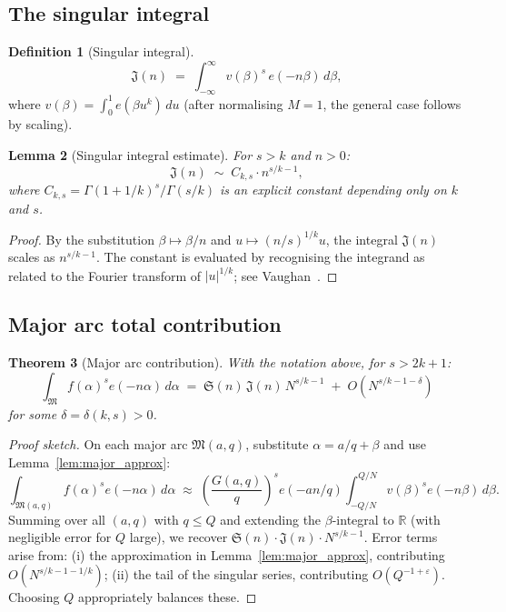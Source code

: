\documentclass[12pt,a4paper]{amsart}
\newtheorem{theorem}{Theorem}[section]
\newtheorem{lemma}[theorem]{Lemma}
\theoremstyle{definition}
\newtheorem{definition}[theorem]{Definition}
\newcommand{\R}{\mathbb{R}}
\newcommand{\eq}[1]{e\!\left(#1\right)}
\begin{document}
\subsection{The singular integral}

\begin{definition}[Singular integral]
  \[
    \mathfrak{J}(n) \;=\; \int_{-\infty}^{\infty} v(\beta)^s\, \eq{-n\beta}\, d\beta,
  \]
  where $v(\beta) = \int_0^1 \eq{\beta u^k}\, du$ (after normalising $M=1$,
  the general case follows by scaling).
\end{definition}

\begin{lemma}[Singular integral estimate]\label{lem:sing_int}
  For $s > k$ and $n > 0$:
  \[
    \mathfrak{J}(n) \;\sim\; C_{k,s} \cdot n^{s/k - 1},
  \]
  where $C_{k,s} = \Gamma(1 + 1/k)^s / \Gamma(s/k)$ is an explicit constant
  depending only on $k$ and $s$.
\end{lemma}

\begin{proof}
  By the substitution $\beta \mapsto \beta/n$ and $u \mapsto (n/s)^{1/k} u$,
  the integral $\mathfrak{J}(n)$ scales as $n^{s/k - 1}$.  The constant
  is evaluated by recognising the integrand as related to the Fourier
  transform of $|u|^{1/k}$; see Vaughan~\cite[Chapter~4]{Vaughan1981}.
\end{proof}

\subsection{Major arc total contribution}

\begin{theorem}[Major arc contribution]\label{thm:major}
  With the notation above, for $s > 2k+1$:
  \[
    \int_{\mathfrak{M}} f(\alpha)^s \eq{-n\alpha}\, d\alpha
    \;=\; \mathfrak{S}(n)\, \mathfrak{J}(n)\, N^{s/k - 1}
          \;+\; O\!\left(N^{s/k - 1 - \delta}\right)
  \]
  for some $\delta = \delta(k, s) > 0$.
\end{theorem}

\begin{proof}[Proof sketch]
  On each major arc $\mathfrak{M}(a, q)$, substitute
  $\alpha = a/q + \beta$ and use Lemma~\ref{lem:major_approx}:
  \[
    \int_{\mathfrak{M}(a,q)} f(\alpha)^s \eq{-n\alpha}\, d\alpha
    \;\approx\; \left(\frac{G(a,q)}{q}\right)^s \eq{-an/q}
                \int_{-Q/N}^{Q/N} v(\beta)^s \eq{-n\beta}\, d\beta.
  \]
  Summing over all $(a, q)$ with $q \leq Q$ and extending the $\beta$-integral
  to $\R$ (with negligible error for $Q$ large), we recover
  $\mathfrak{S}(n) \cdot \mathfrak{J}(n) \cdot N^{s/k-1}$.  Error
  terms arise from: (i) the approximation in Lemma~\ref{lem:major_approx},
  contributing $O(N^{s/k - 1 - 1/k})$; (ii) the tail of the singular
  series, contributing $O(Q^{-1+\varepsilon})$.  Choosing $Q$ appropriately
  balances these.
\end{proof}
\end{document}
